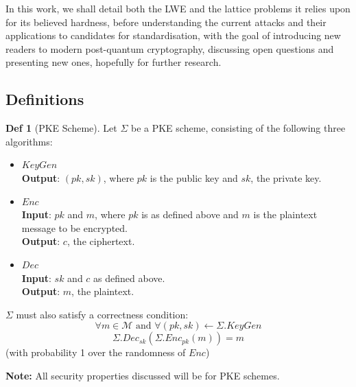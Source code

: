 \documentclass[a4paper, 10pt]{article}
\theoremstyle{definition}
\newtheorem{definition}{Def}[section]
\begin{document}
In this work, we shall detail both the \ac{LWE} and the lattice problems it relies upon for its believed hardness, before understanding the current attacks and their applications to candidates for standardisation, with the goal of introducing new readers to modern post-quantum cryptography, discussing open questions and presenting new ones, hopefully for further research.

\subsection{Definitions}

\begin{definition}[\ac{PKE} Scheme]
    Let $\Sigma$ be a \ac{PKE} scheme, consisting of the following three algorithms:
    \begin{itemize}
        \item $KeyGen$\\ \textbf{Output}: $(pk, sk)$, where $pk$ is the public key and $sk$, the private key.
        \item $Enc$\\ \textbf{Input}: $pk$ and $m$, where $pk$ is as defined above and $m$ is the plaintext message to be encrypted. \\
        \textbf{Output}: $c$, the ciphertext.
        \item $Dec$\\ \textbf{Input}: $sk$ and $c$ as defined above.\\
        \textbf{Output}: $m$, the plaintext.
    \end{itemize}
    $\Sigma$ must also satisfy a correctness condition:
    \[\forall m \in \mathcal{M} \text{ and } \forall (pk, sk) \leftarrow \Sigma .KeyGen\]
    \[\Sigma .Dec_{sk}(\Sigma .Enc_{pk}(m)) = m\]
    (with probability 1 over the randomness of $Enc$)
\end{definition}

\textbf{Note:} All security properties discussed will be for \ac{PKE} schemes.
\end{document}
